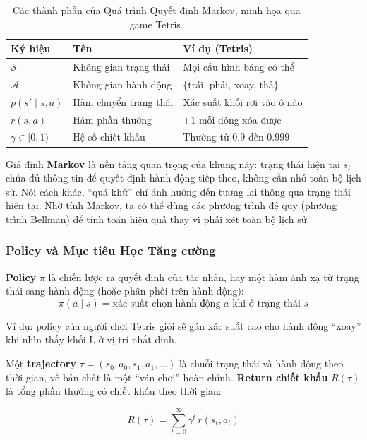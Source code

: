 \begin{table}[H]
    \centering
    \caption{Các thành phần của Quá trình Quyết định Markov, minh họa qua game Tetris.}
    \label{tab:mdp}
    \begin{tabular}{lll}
        \toprule
        \textbf{Ký hiệu} & \textbf{Tên} & \textbf{Ví dụ (Tetris)} \\
        \midrule
        $\mathcal{S}$ & Không gian trạng thái & Mọi cấu hình bảng có thể \\
        $\mathcal{A}$ & Không gian hành động & \{trái, phải, xoay, thả\} \\
        $p(s'\mid s,a)$ & Hàm chuyển trạng thái & Xác suất khối rơi vào ô nào \\
        $r(s,a)$ & Hàm phần thưởng & $+1$ mỗi dòng xóa được \\
        $\gamma \in [0,1)$ & Hệ số chiết khấu & Thường từ $0.9$ đến $0.999$ \\
        \bottomrule
    \end{tabular}
\end{table}
 
Giả định \textbf{Markov} là nền tảng quan trọng của khung này: trạng
thái hiện tại $s_t$ chứa đủ thông tin để quyết định hành động tiếp
theo, không cần nhớ toàn bộ lịch sử. Nói cách khác, ``quá khứ'' chỉ
ảnh hưởng đến tương lai thông qua trạng thái hiện tại. Nhờ tính Markov,
ta có thể dùng các phương trình đệ quy (phương trình Bellman) để tính
toán hiệu quả thay vì phải xét toàn bộ lịch sử.
 
\subsubsection{Policy và Mục tiêu Học Tăng cường}
 
\textbf{Policy} $\pi$ là chiến lược ra quyết định của tác nhân, hay một
hàm ánh xạ từ trạng thái sang hành động (hoặc phân phối trên hành
động):
\[
    \pi(a \mid s) = \text{xác suất chọn hành động } a \text{ khi ở trạng thái }
    s
\]

Ví dụ: policy của người chơi Tetris giỏi sẽ gán xác suất cao cho
hành động ``xoay'' khi nhìn thấy khối L ở vị trí nhất định.

Một \textbf{trajectory} $\tau = (s_0, a_0, s_1, a_1, \ldots)$
là chuỗi trạng thái và hành động theo thời gian, về bản chất là một
``ván chơi'' hoàn chỉnh. \textbf{Return chiết khấu} $R(\tau)$ là
tổng phần thưởng có chiết khấu theo thời gian:
 
\begin{equation}
    R(\tau) = \sum_{t=0}^{\infty} \gamma^t \, r(s_t, a_t)
    \label{eq:return}
\end{equation}
 
